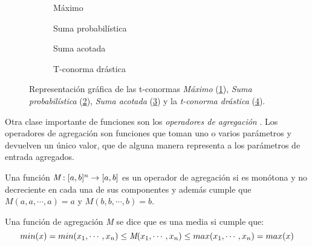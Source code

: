 \begin{figure}[H]
	\centering
	\begin{subfigure}[b]{0.45\textwidth}
		\setlength\figureheight{4.5cm}
		\setlength\figurewidth{6cm}
		
		\caption{Máximo}
		\label{fig:t-conorms-max}
	\end{subfigure}
	\qquad
	\begin{subfigure}[b]{0.45\textwidth}
		\setlength\figureheight{4.5cm}
		\setlength\figurewidth{6cm}
		
		\caption{Suma probabilística}
		\label{fig:t-conorms-probabilistic-sum}
	\end{subfigure}
	
	\vspace{1 cm}
	\begin{subfigure}[b]{0.45\textwidth}
		\setlength\figureheight{4.5cm}
		\setlength\figurewidth{6cm}
		
		\caption{Suma acotada}
		\label{fig:t-conorms-bounded-sum}
	\end{subfigure}
	\qquad
	\begin{subfigure}[b]{0.45\textwidth}
			\setlength\figureheight{4.5cm}
			\setlength\figurewidth{6cm}
			
			\caption{T-conorma drástica}
			\label{fig:t-conorms-drastic}
	\end{subfigure}
	\label{fig:t-conorms}
	\caption{Representación gráfica de las t-conormas \emph{Máximo} (\ref{fig:t-conorms-max}), \emph{Suma probabilística} (\ref{fig:t-conorms-probabilistic-sum}), \emph{Suma acotada} (\ref{fig:t-conorms-bounded-sum})  y la \emph{t-conorma drástica} (\ref{fig:t-conorms-drastic}).}
\end{figure}
Otra clase importante de funciones son los \emph{operadores de agregación} \cite{calvo2002aggregation, beliakov2007aggregation}. Los operadores de agregación son funciones que toman uno o varios parámetros y devuelven un único valor, que de alguna manera representa a los parámetros de entrada agregados.
\begin{definition}
Una función $\emph{M} : [a,b]^{n} \rightarrow [a,b]$ es un operador de agregación si es monótona y no decreciente en cada una de sus componentes y además cumple que $M(a, a, \cdots,a) = a$ y $M(b, b, \cdots,b) = b$.
\end{definition}
\begin{definition}
Una función de agregación \emph{M} se dice que es una media si cumple que:
\begin{equation}\label{def:mean-aggregation-operator}
min(x) = min(x_{1},\cdots,x_{n})\leq \emph{M}(x_{1},\cdots,x_{n}) \leq max(x_{1},\cdots,x_{n}) = max(x)
\end{equation}
\end{definition}
